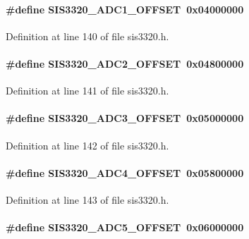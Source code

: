 \paragraph[{SIS3320\_\-ADC1\_\-OFFSET}]{\setlength{\rightskip}{0pt plus 5cm}\#define SIS3320\_\-ADC1\_\-OFFSET~0x04000000}\hfill\label{sis3320_8h_a07e9a555d5350a70560782dcceeb92ab}


Definition at line 140 of file sis3320.h.
\paragraph[{SIS3320\_\-ADC2\_\-OFFSET}]{\setlength{\rightskip}{0pt plus 5cm}\#define SIS3320\_\-ADC2\_\-OFFSET~0x04800000}\hfill\label{sis3320_8h_a22b0d57ff06363ab6c32265a46cd897d}


Definition at line 141 of file sis3320.h.
\paragraph[{SIS3320\_\-ADC3\_\-OFFSET}]{\setlength{\rightskip}{0pt plus 5cm}\#define SIS3320\_\-ADC3\_\-OFFSET~0x05000000}\hfill\label{sis3320_8h_ab3781d6bab3bb6bf3dcc801dc8929d77}


Definition at line 142 of file sis3320.h.
\paragraph[{SIS3320\_\-ADC4\_\-OFFSET}]{\setlength{\rightskip}{0pt plus 5cm}\#define SIS3320\_\-ADC4\_\-OFFSET~0x05800000}\hfill\label{sis3320_8h_a76cea986c758caa50084603018ef9275}


Definition at line 143 of file sis3320.h.
\paragraph[{SIS3320\_\-ADC5\_\-OFFSET}]{\setlength{\rightskip}{0pt plus 5cm}\#define SIS3320\_\-ADC5\_\-OFFSET~0x06000000}\hfill\label{sis3320_8h_ad787840c238e599a40552c37d9dce427}


